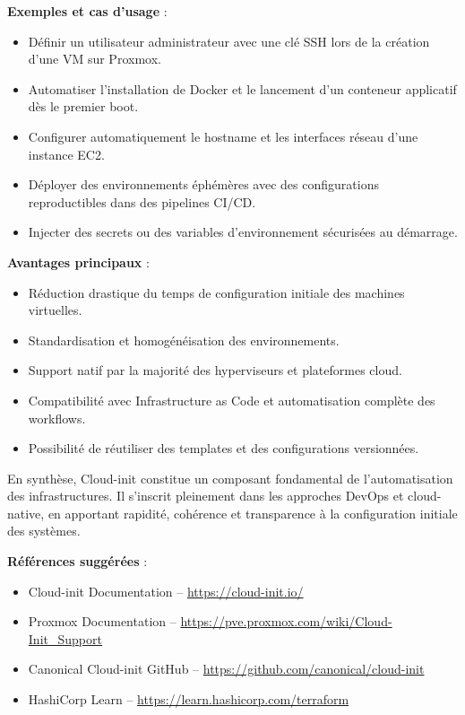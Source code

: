 \textbf{Exemples et cas d’usage} :
\begin{itemize}
	\item Définir un utilisateur administrateur avec une clé SSH lors de la création d’une VM sur Proxmox.
	\item Automatiser l’installation de Docker et le lancement d’un conteneur applicatif dès le premier boot.
	\item Configurer automatiquement le hostname et les interfaces réseau d’une instance EC2.
	\item Déployer des environnements éphémères avec des configurations reproductibles dans des pipelines CI/CD.
	\item Injecter des secrets ou des variables d’environnement sécurisées au démarrage.
\end{itemize}

\textbf{Avantages principaux} :
\begin{itemize}
	\item Réduction drastique du temps de configuration initiale des machines virtuelles.
	\item Standardisation et homogénéisation des environnements.
	\item Support natif par la majorité des hyperviseurs et plateformes cloud.
	\item Compatibilité avec Infrastructure as Code et automatisation complète des workflows.
	\item Possibilité de réutiliser des templates et des configurations versionnées.
\end{itemize}

En synthèse, Cloud-init constitue un composant fondamental de l’automatisation des infrastructures. Il s’inscrit pleinement dans les approches DevOps et cloud-native, en apportant rapidité, cohérence et transparence à la configuration initiale des systèmes.

\textbf{Références suggérées} :
\begin{itemize}
	\item Cloud-init Documentation – \url{https://cloud-init.io/}
	\item Proxmox Documentation – \url{https://pve.proxmox.com/wiki/Cloud-Init_Support}
	\item Canonical Cloud-init GitHub – \url{https://github.com/canonical/cloud-init}
	\item HashiCorp Learn – \url{https://learn.hashicorp.com/terraform}
\end{itemize}

